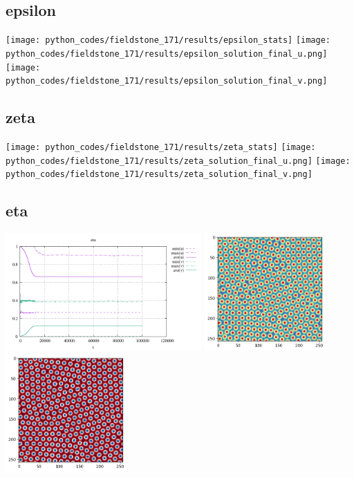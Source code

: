 \subsection*{epsilon}
\begin{center}
\texttt{[image: python\_codes/fieldstone\_171/results/epsilon\_stats]}
\texttt{[image: python\_codes/fieldstone\_171/results/epsilon\_solution\_final\_u.png]}
\texttt{[image: python\_codes/fieldstone\_171/results/epsilon\_solution\_final\_v.png]}
\end{center}

\subsection*{zeta}
\begin{center}
\texttt{[image: python\_codes/fieldstone\_171/results/zeta\_stats]}
\texttt{[image: python\_codes/fieldstone\_171/results/zeta\_solution\_final\_u.png]}
\texttt{[image: python\_codes/fieldstone\_171/results/zeta\_solution\_final\_v.png]}
\end{center}

\subsection*{eta}
\begin{center}
\includegraphics[height=4.5cm]{python_codes/fieldstone_171/results/eta_stats}
\includegraphics[height=4.5cm]{python_codes/fieldstone_171/results/eta_solution_final_u.png}
\includegraphics[height=4.5cm]{python_codes/fieldstone_171/results/eta_solution_final_v.png}
\end{center}

